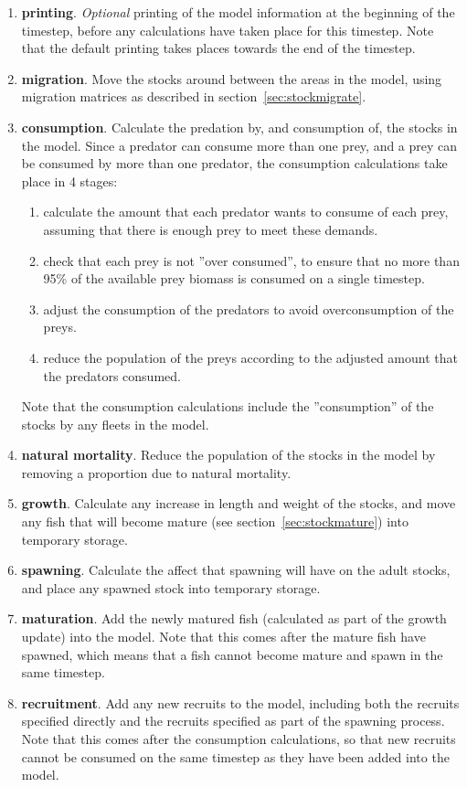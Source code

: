 \documentclass[10pt,twoside]{book}
\begin{document}
\begin{enumerate}
\item {\bf printing}.  \textit{Optional} printing of the model information at the beginning of the timestep, before any calculations have taken place for this timestep.  Note that the default printing takes places towards the end of the timestep.
\item {\bf migration}.  Move the stocks around between the areas in the model, using migration matrices as described in section~\ref{sec:stockmigrate}.
\item {\bf consumption}.  Calculate the predation by, and consumption of, the stocks in the model.  Since a predator can consume more than one prey, and a prey can be consumed by more than one predator, the consumption calculations take place in 4 stages:
\begin{enumerate}
\item calculate the amount that each predator wants to consume of each prey, assuming that there is enough prey to meet these demands.
\item check that each prey is not ''over consumed'', to ensure that no more than 95\% of the available prey biomass is consumed on a single timestep.
\item adjust the consumption of the predators to avoid overconsumption of the preys.
\item reduce the population of the preys according to the adjusted amount that the predators consumed.
\end{enumerate}
Note that the consumption calculations include the ''consumption'' of the stocks by any fleets in the model.
\item {\bf natural mortality}.  Reduce the population of the stocks in the model by removing a proportion due to natural mortality.
\item {\bf growth}.  Calculate any increase in length and weight of the stocks, and move any fish that will become mature (see section~\ref{sec:stockmature}) into temporary storage.
\item {\bf spawning}.  Calculate the affect that spawning will have on the adult stocks, and place any spawned stock into temporary storage.
\item {\bf maturation}.  Add the newly matured fish (calculated as part of the growth update) into the model.  Note that this comes after the mature fish have spawned, which means that a fish cannot become mature and spawn in the same timestep.
\item {\bf recruitment}.  Add any new recruits to the model, including both the recruits specified directly and the recruits specified as part of the spawning process.  Note that this comes after the consumption calculations, so that new recruits cannot be consumed on the same timestep as they have been added into the model.

\end{enumerate}
\end{document}

